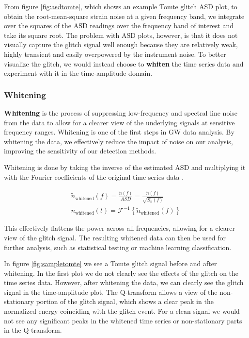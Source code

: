 \documentclass[12pt]{article}
\begin{document}
\medskip
\noindent From figure \ref{fig:asdtomte}, which shows an example Tomte glitch ASD plot, to obtain the root-mean-square strain noise at a given frequency band, we integrate over the squares of the ASD readings over the frequency band of interest and take its square root. The problem with ASD plots, however, is that it does not visually capture the glitch signal well enough because they are relatively weak, highly transient and easily overpowered by the instrument noise. To better visualize the glitch, we would instead choose to \textbf{whiten} the time series data and experiment with it in the time-amplitude domain.


\subsubsection{Whitening}\label{Whitening}

\textbf{Whitening} is the process of suppressing low-frequency and spectral line noise from the data to allow for a clearer view of the underlying signals at sensitive frequency ranges. Whitening is one of the first steps in GW data analysis. By whitening the data, we effectively reduce the impact of noise on our analysis, improving the sensitivity of our detection methods.

\medskip
\noindent Whitening is done by taking the inverse of the estimated ASD and multiplying it with the Fourier coefficients of the original time series data \cite{collaboration_guide_2020}.

\begin{align}
    \tilde{n}_\text{whitened}(f) = \frac{\tilde{n}(f)}{ASD} = \frac{\tilde{n}(f)}{\sqrt{S_n(f)}} \\
    n_\text{whitened}(t) = \mathcal{F}^{-1} \left\{ \tilde{n}_\text{whitened}(f) \right\}
    \label{eq:whitening}
\end{align}

\medskip
\noindent This effectively flattens the power across all frequencies, allowing for a clearer view of the glitch signal. The resulting whitened data can then be used for further analysis, such as statistical testing or machine learning classification.

\medskip
\noindent In figure \ref{fig:sampletomte} we see a Tomte glitch signal before and after whitening. In the first plot we do not clearly see the effects of the glitch on the time series data. However, after whitening the data, we can clearly see the glitch signal in the time-amplitude plot. The Q-transform allows a view of the non-stationary portion of the glitch signal, which shows a clear peak in the normalized energy coinciding with the glitch event. For a clean signal we would not see any significant peaks in the whitened time series or non-stationary parts in the Q-transform.
\end{document}
